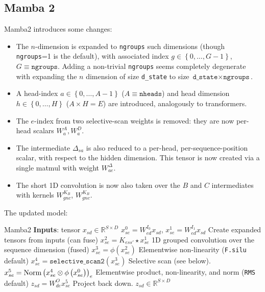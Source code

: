 \subsection{Mamba 2}

Mamba2 introduces some changes:
\begin{itemize}
    \item The $ n $-dimension is expanded to \texttt{ngroups} such dimensions (though
        \texttt{ngroups}=1 is the default), with associated index $ g\in \left \{ 0, \ldots , G-1
        \right \} $, $ G \equiv  \texttt{ngroups} $. Adding a non-trivial \texttt{ngroups} seems
        completely degenerate with expanding the $ n $ dimension of size \texttt{d\_state} to size
        $\texttt{d\_state}\times \texttt{ngroups} $.
    \item A head-index $ a \in \left \{ 0, \ldots , A-1 \right \} $ ($ A \equiv  \texttt{nheads} $)
        and head dimension $ h \in \left \{ 0, \ldots , H \right \} $ ($ A\times H= E $) are
        introduced, analogously to transformers.
    \item The $ e $-index from two selective-scan weights is removed: they are now per-head scalars $
        W ^{ A }_{ a }, W ^{ D }_{ a } $.
    \item The intermediate $ \Delta _{ sa } $ is also reduced to a per-head, per-sequence-position
        scalar, with respect to the hidden dimension. This tensor is now created via a single matmul
        with weight $ W ^{ \Delta }_{ ae } $.
    \item The short 1D convolution is now also taken over the $ B $ and $ C $ intermediates with
        kernels $W ^{ K _{ B } }_{ gnc } $, $ W ^{ K _{ B } }_{ gnc } $.
\end{itemize}

The updated model:
\begin{algo}{Mamba2}
\State \textbf{Inputs}: tensor $ x _{ sd }\in \mathbb{R}^{ S\times D } $
\State $ x ^{ 0 } _{ se } = W ^{ I _{ 0 } }_{ ed } x _{ sd }$, $ x ^{ 1 }  _{ se } = W ^{ I _{ 1 } }_{ ed } x _{ sd } $ \Comment Create expanded tensors from inputs (can fuse)
\State $ x ^{ 2 } _{ se } = K _{ ess' }\star x ^{ 1 }_{ se }$ \Comment 1D grouped convolution over the sequence dimension (fused)
\State $ x ^{ 3 } _{ se } = \phi \left ( x ^{ 2 }_{ se } \right )$ \Comment Elementwise non-linearity (\texttt{F.silu} default)
\State $ x ^{ 4 } _{ se } = \texttt{selective\_scan2} \left ( x ^{ 3 }_{ se } \right )$ \Comment Selective scan (see below).
\State $ x ^{ 5 } _{ se } = {\rm Norm }\left (x ^{ 4 }  _{ se }\otimes\phi \left ( x ^{ 0 }_{ se } \right )\right ) _{ e }$ \Comment Elementwise product, non-linearity, and norm (\texttt{RMS} default)
\State $ z _{ sd } = W ^{ O }_{ de }x ^{ 5 }_{ se }$ \Comment Project back down.
\State \Return $ z _{ sd } \in \mathbb{R}^{ S\times D }$
\label{algo_mamba_2}
\end{algo}

